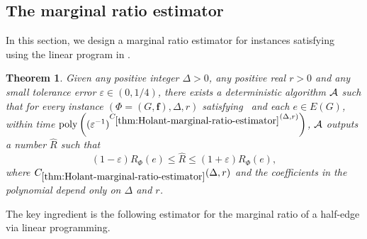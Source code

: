 \documentclass[11pt]{article}
\newtheorem{theorem}{Theorem}
\def\poly{\mathrm{poly}}
\newcommand{\wh}[1]{\widehat{#1}}
\newcommand{\vecf}{\boldsymbol{f}}
\newcommand{\hktodo}[1]{{\color{blue}{#1}}}
\begin{document}
\subsection{The marginal ratio estimator}
In this section, we design a marginal ratio estimator for instances satisfying~ using the linear program in .

\hktodo{polish this paragraph}

\begin{theorem} \label{thm:Holant-marginal-ratio-estimator}
    Given any positive integer $\Delta > 0$, any positive real $r > 0$ and any small tolerance error $\varepsilon \in (0, 1/4)$, there exists a deterministic algorithm $\mathcal{A}$ such that for every instance $(\Phi = (G, \vecf), \Delta, r)$ satisfying~ and each $e \in E(G)$, within time $\poly\left((\varepsilon^{-1})^{C_{\ref{thm:Holant-marginal-ratio-estimator}}(\Delta, r)}\right)$, $\mathcal{A}$ outputs a number $\wh{R}$ such that
    $$
        (1 - \varepsilon) R_{\Phi}(e) \le \wh{R} \le (1 + \varepsilon) R_{\Phi}(e),
    $$
    where $C_{\ref{thm:Holant-marginal-ratio-estimator}}(\Delta, r)$ and the coefficients in the polynomial depend only on $\Delta$ and $r$.
\end{theorem}

The key ingredient is the following estimator for the marginal ratio of a half-edge via linear programming.
\end{document}
